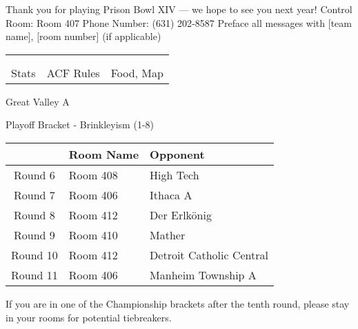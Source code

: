 \documentclass{article}%
\begin{document}
\newline%
Thank you for playing Prison Bowl XIV — we hope to see you next year!\newline%
\newline%
Control Room: Room 407\newline%
Phone Number: (631) 202{-}8587\newline%
Preface all messages with {[}team name{]}, {[}room number{]} (if applicable)%
\vspace*{30pt}%
\newline%
%
\begin{tabularx}{\textwidth}{YYY}%
  &  &  \\%
\\%
Stats&ACF Rules&Food, Map\\%
\end{tabularx}%
\newpage%
\begin{center}%
\begin{Huge}%
Great Valley A%
\end{Huge}%
\vspace*{12pt}%
\linebreak%
\begin{Large}%
Playoff Bracket {-} Brinkleyism (1{-}8)%
\end{Large}%
\end{center}%
\vspace*{4pt}%
%
\begin{tabularx}{\textwidth}{|c|Y|Y|}%
\hline%
&Room Name&Opponent\\%
\hline%
Round 6&Room 408&High Tech\\%
Round 7&Room 406&Ithaca A\\%
Round 8&Room 412&Der Erlkönig\\%
Round 9&Room 410&Mather\\%
Round 10&Room 412&Detroit Catholic Central\\%
Round 11&Room 406&Manheim Township A\\%
\hline%
\end{tabularx}%
\vspace*{30pt}%
\linebreak%
If you are in one of the Championship brackets after the tenth round, please stay in your rooms for potential tiebreakers.\newline%
\end{document}
